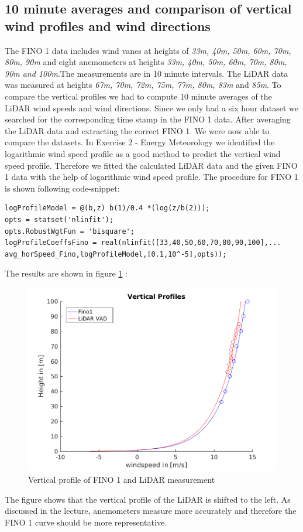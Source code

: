 \documentclass[10pt]{article}
\begin{document}
\subsection{10 minute averages and comparison of vertical wind profiles and wind directions}
The FINO 1 data includes wind vanes at heights of \textit{33m, 40m, 50m, 60m, 70m, 80m, 90m} and eight anemometers at heights \textit{33m, 40m, 50m, 60m, 70m, 80m, 90m and 100m}.The measurements are in 10 minute intervals. The LiDAR data was measured at heights \textit{67m, 70m, 72m, 75m, 77m, 80m,	83m} and \textit{85m}.
To compare the vertical profiles we had to compute 10 minute averages of the LiDAR wind speeds and wind directions. Since we only had a six hour dataset we searched for the corresponding time stamp in the FINO 1 data. After averaging the LiDAR data and extracting the correct FINO 1. We were now able to compare the datasets. 
In Exercise 2 - Energy Meteorology we identified the logarithmic wind speed profile as a good method to predict the vertical wind speed profile.
Therefore we fitted the calculated LiDAR data and the given FINO 1 data with the help of logarithmic wind speed profile. 
The procedure for FINO 1 is shown following code-snippet:
\begin{lstlisting}
logProfileModel = @(b,z) b(1)/0.4 *(log(z/b(2)));
opts = statset('nlinfit');
opts.RobustWgtFun = 'bisquare';
logProfileCoeffsFino = real(nlinfit([33,40,50,60,70,80,90,100],...
avg_horSpeed_Fino,logProfileModel,[0.1,10^-5],opts));
\end{lstlisting}
The results are shown in figure \ref{fig:verticalprofiles} :
\begin{figure}[H]
\includegraphics[width=1\linewidth]{../Exercises_and_Tasks/ex2/figures/verticalProfiles.png}
\caption{Vertical profile of FINO 1 and LiDAR measurement}
\label{fig:verticalprofiles}
\end{figure}
The figure shows that the vertical profile of the LiDAR is shifted to the left. As discussed in the lecture, anemometers measure more accurately and therefore the FINO 1 curve should be more representative. 
\end{document}
